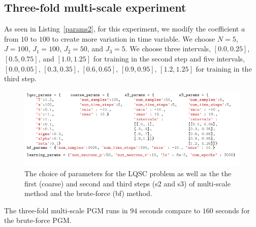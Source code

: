 \documentclass{article}
\numberwithin{equation}{section}
\begin{document}
\subsection{Three-fold multi-scale experiment}
As seen in Listing~\eqref{params2}, for this experiment, we modify the coefficient $a$ from $10$ to $100$ to create more variation in time variable. We choose $N=5$, $J=100$, $J_1=100$, $J_2=50$, and $J_3=5$. We choose three intervals, $[0.0,0.25]$, $[0.5,0.75]$, and $[1.0,1.25]$ for training in the second step and five intervals, $[0.0, 0.05]$, $[0.3, 0.35]$, $[0.6, 0.65]$, $[0.9, 0.95]$, $[1.2, 1.25]$ for training in the third step. 

\begin{figure}[H]\centering
\includegraphics[width=\textwidth]{figures/ms3_params.pdf}
\caption{The choice of parameters for the LQSC problem as well as the the first (coarse) and second and third steps (s2 and s3) of multi-scale method and the brute-force (bf) method.}
    \label{params2}
\end{figure}

The three-fold multi-scale PGM runs in $94$ seconds compare to $160$ seconds for the brute-force PGM.
\end{document}
